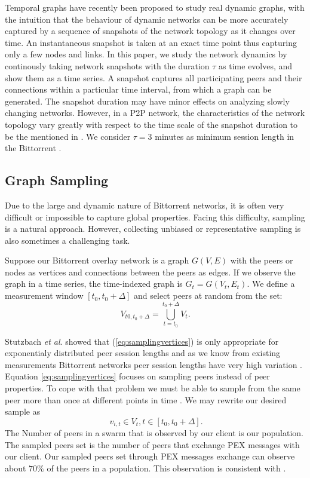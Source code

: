 \documentclass[10pt,conference,letterpaper]{IEEEtran}
\begin{document}
Temporal graphs have recently been proposed to study real dynamic graphs, with the intuition that the behaviour of dynamic networks can be more accurately captured by a sequence of snapshots of the network topology as it changes over time.
An instantaneous snapshot is taken at an exact time point thus capturing only a few nodes and links.
In this paper, we study the network dynamics by continously taking network snapshots with the duration $\tau$ as time evolves, and show them as a time series.
A snapshot captures all participating peers and their connections within a particular time interval, from which a graph can be generated.
The snapshot duration may have minor effects on analyzing slowly changing networks.
However, in a P2P network, the characteristics of the network topology vary greatly with respect to the time scale of the snapshot duration to be the mentioned in \cite{stutzbach2008characterizing}.
We consider $\tau=3 $ minutes as minimum session length in the Bittorrent \cite{stutzbach2006understanding}. 

\subsection{Graph Sampling}
Due to the large and dynamic nature of Bittorrent networks, it is often very difficult or impossible to capture global properties. 
Facing this difficulty, sampling is a natural approach.
However, collecting unbiased or representative sampling is also sometimes a challenging task.

Suppose our Bittorrent overlay network is a graph $G(V,E)$ with the peers or nodes as vertices and connections between the peers as edges. 
If we observe the graph in a time series, the time-indexed graph is $G_t = G(V_t,E_t)$.   
We define a measurement window $[t_0,t_0 + \Delta]$ and select peers at random from the set:
 \begin{equation}
V_{t0,t_0+\Delta} = \bigcup_{t=t_0}^{t_0+\Delta} V_t.
 \label{eq:samplingvertices}
 \end{equation}

Stutzbach \textit{et al}. \cite{stutzbach2007sampling} showed that  (\ref{eq:samplingvertices}) is only appropriate for exponentialy distributed  peer session lengths and as we know from existing measurements Bittorrent networks peer session lengths have very high variation \cite{guo2005measurements}.  
Equation \ref{eq:samplingvertices} focuses on sampling peers instead of peer properties. 
To cope with that problem we must be able to sample from the same peer more than once at different points in time \cite{stutzbach2007sampling}. 
We may rewrite our desired sample as
\begin{equation}
\ v_{i,t} \in V_t  , t \in [t_0, t_0 + \Delta].
\label{eq:samplingvertices2}
\end{equation}
The Number of peers in a swarm that is observed by our client is our population. 
The sampled peers set is the number of peers that exchange PEX messages with our client.
Our sampled peers set through PEX messages exchange can observe about $70\%$ of the peers in a population.
This observation is consistent with \cite{wu2010understanding}.
\end{document}
